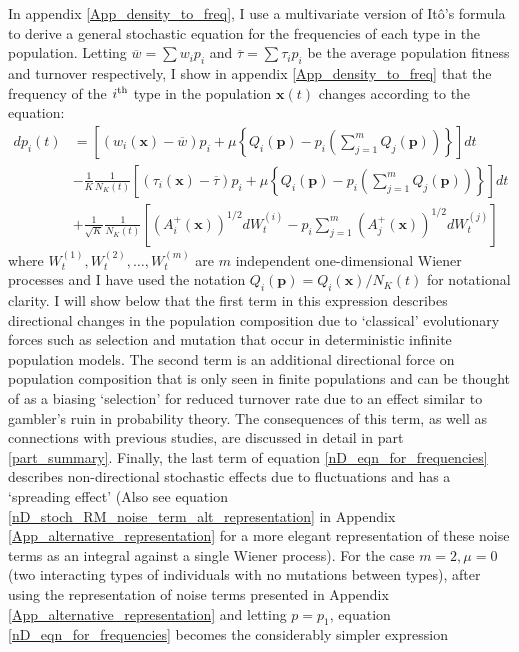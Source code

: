 In appendix \ref{App_density_to_freq}, I use a multivariate version of It\^{o}'s formula to derive a general stochastic equation for the frequencies of each type in the population. Letting $\overline{w} = \sum w_ip_i$ and $\overline{\tau} = \sum \tau_i p_i$ be the average population fitness and turnover respectively, I show in appendix \ref{App_density_to_freq} that the frequency of the $i\textsuperscript{th}$ type in the population $\mathbf{x}(t)$ changes according to the equation:
\begin{equation}
\label{nD_eqn_for_frequencies}
\begin{aligned}
dp_i(t) &= \left[(w_i(\mathbf{x}) - \overline{w})p_i + \mu\left\{Q_i(\mathbf{p}) - p_i\left(\sum\limits_{j=1}^{m}Q_j(\mathbf{p})\right)\right\}\right]dt\\
&- \frac{1}{K}\frac{1}{N_{K}(t)}\left[(\tau_i(\mathbf{x}) - \overline{\tau})p_i + \mu\left\{Q_i(\mathbf{p}) - p_i\left(\sum\limits_{j=1}^{m}Q_j(\mathbf{p})\right)\right\}\right]dt\\
&+ \frac{1}{\sqrt{K}}\frac{1}{N_{K}(t)}\left[\left(A^{+}_{i}(\mathbf{x})\right)^{1/2}dW^{(i)}_t - p_i\sum\limits_{j=1}^{m}\left(A^{+}_{j}(\mathbf{x})\right)^{1/2}dW^{(j)}_t\right]
\end{aligned}
\end{equation}
where $W^{(1)}_t,W^{(2)}_t, \ldots, W^{(m)}_t$ are $m$ independent one-dimensional Wiener processes and I have used the notation $Q_i(\mathbf{p}) = Q_i(\mathbf{x})/N_K(t)$ for notational clarity. I will show below that the first term in this expression describes directional changes in the population composition due to `classical' evolutionary forces such as selection and mutation that occur in deterministic infinite population models. The second term is an additional directional force on population composition that is only seen in finite populations and can be thought of as a biasing `selection' for reduced turnover rate due to an effect similar to gambler's ruin in probability theory. The consequences of this term, as well as connections with previous studies, are discussed in detail in part \ref{part_summary}. Finally, the last term of equation \eqref{nD_eqn_for_frequencies} describes non-directional stochastic effects due to fluctuations and has a `spreading effect' (Also see equation \eqref{nD_stoch_RM_noise_term_alt_representation} in Appendix \ref{App_alternative_representation} for a more elegant representation of these noise terms as an integral against a single Wiener process). For the case $m=2, \mu = 0$ (two interacting types of individuals with no mutations between types), after using the representation of noise terms presented in Appendix \ref{App_alternative_representation} and letting $p = p_1$, equation \eqref{nD_eqn_for_frequencies} becomes the considerably simpler expression
